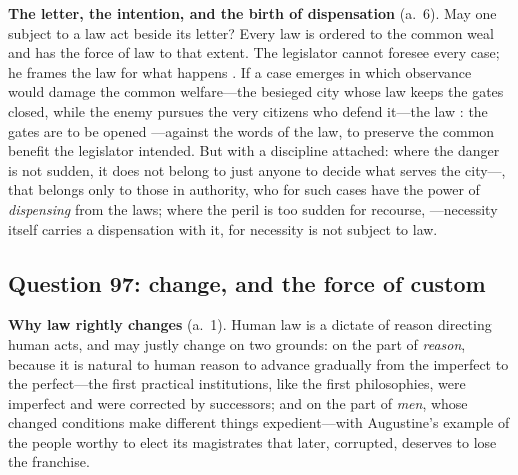 \textbf{The letter, the intention, and the birth of dispensation} (a.~6). May one subject to a law act beside its letter? Every law is ordered to the common weal and has the force of law to that extent. The legislator cannot foresee every case; he frames the law for what happens . If a case emerges in which observance would damage the common welfare---the besieged city whose law keeps the gates closed, while the enemy pursues the very citizens who defend it---the law : the gates are to be opened ---against the words of the law, to preserve the common benefit the legislator intended. But with a discipline attached: where the danger is not sudden, it does not belong to just anyone to decide what serves the city---, that belongs only to those in authority, who for such cases have the power of \emph{dispensing} from the laws; where the peril is too sudden for recourse, ---necessity itself carries a dispensation with it, for necessity is not subject to law.

\subsection{Question 97: change, and the force of custom}

\textbf{Why law rightly changes} (a.~1). Human law is a dictate of reason directing human acts, and may justly change on two grounds: on the part of \emph{reason}, because it is natural to human reason to advance gradually from the imperfect to the perfect---the first practical institutions, like the first philosophies, were imperfect and were corrected by successors; and on the part of \emph{men}, whose changed conditions make different things expedient---with Augustine's example of the people worthy to elect its magistrates that later, corrupted, deserves to lose the franchise.

